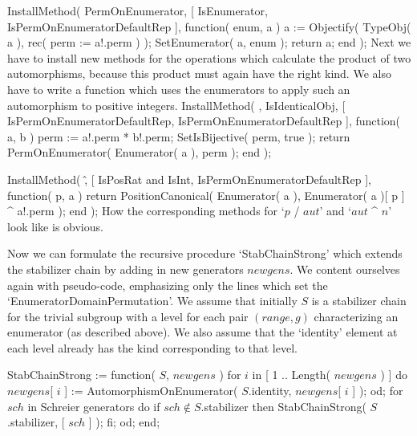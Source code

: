 \begintt
InstallMethod( PermOnEnumerator,
        [ IsEnumerator, IsPermOnEnumeratorDefaultRep ],
    function( enum, a )
    a := Objectify( TypeObj( a ), rec( perm := a!.perm ) );
    SetEnumerator( a, enum );
    return a;
end );
\endtt
Next we  have to install new  methods for the  operations which calculate
the  product of two automorphisms, because   this product must again have
the    right kind. We    also have to write  a    function which uses the
enumerators to apply such an automorphism to positive integers.
\begintt
InstallMethod( \*, IsIdenticalObj,
        [ IsPermOnEnumeratorDefaultRep, IsPermOnEnumeratorDefaultRep ],
    function( a, b )
    perm := a!.perm * b!.perm;
    SetIsBijective( perm, true );
    return PermOnEnumerator( Enumerator( a ), perm );
end );
\endtt

\begintt
InstallMethod( \^,
        [ IsPosRat and IsInt, IsPermOnEnumeratorDefaultRep ],
    function( p, a )
    return PositionCanonical( Enumerator( a ),
                   Enumerator( a )[ p ] ^ a!.perm );
end );
\endtt
How the corresponding  methods for `$p$ /  $aut$' and `$aut$  ^ $n$' look
like is obvious.

Now we  can  formulate  the recursive procedure   `StabChainStrong' which
extends  the stabilizer chain by adding  in new  generators $newgens$. We
content  ourselves again   with pseudo-code, emphasizing  only  the lines
which set the `EnumeratorDomainPermutation'. We assume that initially $S$
is a stabilizer chain for the trivial subgroup with a level for each pair
$(range,g)$ characterizing an enumerator  (as  described above). We  also
assume that  the `identity'  element at each  level already  has the kind
corresponding to that level.

StabChainStrong := function( $S$, $newgens$ )
\quad for $i$  in [ 1 .. Length( $newgens$ ) ]  do
\qquad $newgens$[ $i$ ] := %
  AutomorphismOnEnumerator( $S$.identity, $newgens$[ $i$ ] );
\quad od;
\quad for $sch$  in {\rm Schreier generators}  do
\qquad if $sch \notin S$.stabilizer  then
\qquad\quad StabChainStrong( $S$.stabilizer, [ $sch$ ] );
\qquad fi;
\quad od;
end;

